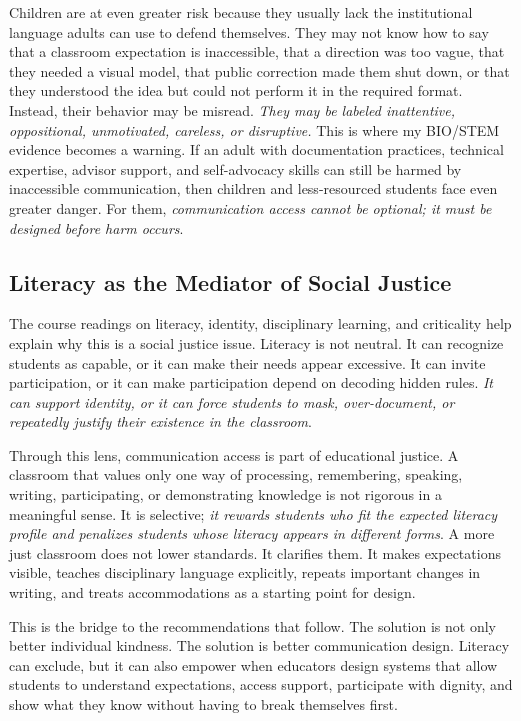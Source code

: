 \documentclass[11pt]{article}
\begin{document}
Children are at even greater risk because they usually lack the institutional language adults can use to defend themselves. They may not know how to say that a classroom expectation is inaccessible, that a direction was too vague, that they needed a visual model, that public correction made them shut down, or that they understood the idea but could not perform it in the required format. Instead, their behavior may be misread. \textit{They may be labeled inattentive, oppositional, unmotivated, careless, or disruptive.} This is where my BIO/STEM evidence becomes a warning. If an adult with documentation practices, technical expertise, advisor support, and self-advocacy skills can still be harmed by inaccessible communication, then children and less-resourced students face even greater danger. For them, \textit{communication access cannot be optional; it must be designed before harm occurs}.

\subsection*{Literacy as the Mediator of Social Justice}

The course readings on literacy, identity, disciplinary learning, and criticality help explain why this is a social justice issue. Literacy is not neutral. It can recognize students as capable, or it can make their needs appear excessive. It can invite participation, or it can make participation depend on decoding hidden rules. \textit{It can support identity, or it can force students to mask, over-document, or repeatedly justify their existence in the classroom}.

Through this lens, communication access is part of educational justice. A classroom that values only one way of processing, remembering, speaking, writing, participating, or demonstrating knowledge is not rigorous in a meaningful sense. It is selective; \textit{it rewards students who fit the expected literacy profile and penalizes students whose literacy appears in different forms}. A more just classroom does not lower standards. It clarifies them. It makes expectations visible, teaches disciplinary language explicitly, repeats important changes in writing, and treats accommodations as a starting point for design.

This is the bridge to the recommendations that follow. The solution is not only better individual kindness. The solution is better communication design. Literacy can exclude, but it can also empower when educators design systems that allow students to understand expectations, access support, participate with dignity, and show what they know without having to break themselves first.
\end{document}
